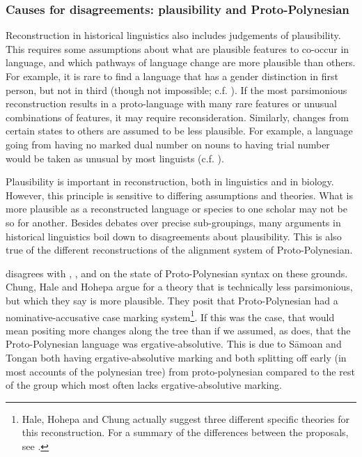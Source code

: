 \documentclass[a4paper,10pt]{article} %
\begin{document}



\subsubsection{Causes for disagreements: plausibility and Proto-Polynesian}
Reconstruction in historical linguistics also includes judgements of plausibility. This requires some assumptions about what are plausible features to co-occur in language, and which pathways of language change are more plausible than others. For example, it is rare to find a language that has a gender distinction in first person, but not in third (though not impossible; c.f. \citet{wals-44}). If the most parsimonious reconstruction results in a proto-language with many rare features or unusual combinations of features, it may require reconsideration. Similarly, changes from certain states to others are assumed to be less plausible. For example, a language going from having no marked dual number on nouns to having trial number would be taken as unusual by most linguists (c.f. \citet[8]{kikusawa_2006_pro_number}). 

Plausibility is important in reconstruction, both in linguistics and in biology. However, this principle is sensitive to differing assumptions and theories. What is more plausible as a reconstructed language or species to one scholar may not be so for another. Besides debates over precise sub-groupings, many arguments in historical linguistics boil down to disagreements about plausibility. This is also true of the different reconstructions of the alignment system of Proto-Polynesian.

\citet{clark1976aspects} disagrees with \citet{hale_1968}, \citet{hohepa_1969}, and \citet{chung1978} on the state of Proto-Polynesian syntax on these grounds. Chung, Hale and Hohepa argue for a theory that is technically less parsimonious, but which they say is more plausible. They posit that Proto-Polynesian had a nominative-accusative case marking system\footnote{Hale, Hohepa and Chung actually suggest three different specific theories for this reconstruction. For a summary of the differences between the proposals, see \citet[247-249]{chung1978}.}. If this was the case, that would mean positing more changes along the tree than if we assumed, as \citet{clark1976aspects} does, that the Proto-Polynesian language was ergative-absolutive. This is due to S\={a}moan and Tongan both having ergative-absolutive marking and both splitting off early (in most accounts of the polynesian tree) from proto-polynesian compared to the rest of the group which most often lacks ergative-absolutive marking.
\end{document}
